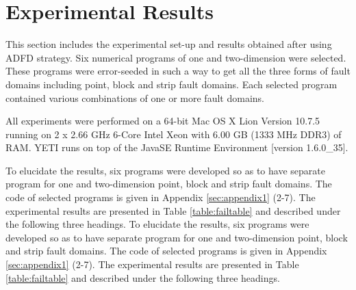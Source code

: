 
\section{Experimental Results} \label{sec:experimentalResults}
This section includes the experimental set-up and results obtained after using ADFD strategy. Six numerical programs of one and two-dimension were selected. These programs were error-seeded in such a way to get all the three forms of fault domains including point, block and strip fault domains. Each selected program contained various combinations of one or more fault domains. 

All experiments were performed on a 64-bit Mac OS X Lion Version 10.7.5 running on 2 x 2.66 GHz 6-Core Intel Xeon with 6.00 GB (1333 MHz DDR3) of RAM. YETI runs on top of the Java\texttrademark  SE Runtime Environment [version 1.6.0\_35]. 

To elucidate the results, six programs were developed so as to have separate program for one and two-dimension point, block and strip fault domains. The code of selected programs is given in Appendix \ref{sec:appendix1} (2-7). The experimental results are presented in Table \ref{table:failtable} and described under the following three headings.
To elucidate the results, six programs were developed so as to have separate program for one and two-dimension point, block and strip fault domains. The code of selected programs is given in Appendix \ref{sec:appendix1} (2-7). The experimental results are presented in Table \ref{table:failtable} and described under the following three headings.


